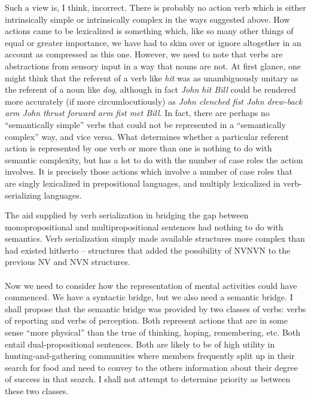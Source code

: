 Such a view is, I think, incorrect. There is probably no action verb which is either intrinsically simple or intrinsically complex in the ways suggested above. How actions came to be lexicalized is something which, like so many other things of equal or greater importance, we
have had to skim over or ignore altogether in an account as compressed as this one. However, we need to note that verbs are abstractions from sensory input in a way that nouns are not. At first glance, one might think that the referent of a verb like \textit{hit} was as unambiguously unitary as the referent of a noun like \textit{dog}, although in fact \textit{John hit Bill} could be rendered more accurately (if more circumlocutiously) as \textit{John clenched fist John drew-back arm John thrust forward arm fist met Bill}. In fact, there are perhaps no ``semantically simple'' verbs that could not be represented in a ``semantically complex'' way, and vice versa. What determines whether a particular referent action is repre\-sented by one verb or more than one is nothing to do with semantic complexity, but has a lot to do with the number of case roles the action involves. It is precisely those actions which involve a number of case roles that are singly lexicalized in prepositional languages, and multiply lexicalized in verb-serializing languages.

The aid supplied by verb serialization in bridging the gap between monopropositional and multipropositional sentences had nothing to do with semantics. Verb serialization simply made available structures more complex than had existed hitherto -- structures that added the possibility of NVNVN to the previous NV and NVN structures.\\\\

Now we need to consider how the representation of mental activities could have commenced. We have a syntactic bridge, but we also need a semantic bridge. I shall propose that the semantic bridge was provided by two classes of verbs: verbs of reporting and verbs of perception. Both represent actions that are in some sense ``more physical'' than the true  of thinking, hoping, remembering, etc. Both entail dual-propositional sentences. Both are likely to be of high utility in hunting-and-gathering communities where members frequently split up in their search for food and need to con\-vey to the others information about their degree of success in that search. I shall not attempt to determine priority as between these two classes.

